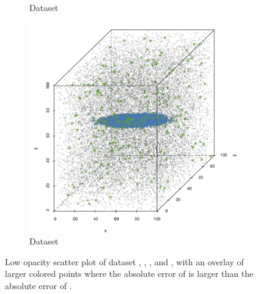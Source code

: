 \begin{figure}
\begin{subfigure}{0.23\textwidth}
			\caption{Dataset \baakmanFour}
			\label{fig:discussion:performance:mbeLowerError:baakman4}
		\end{subfigure}		
		\begin{subfigure}{0.23\textwidth}
			\centering
			\includegraphics[keepaspectratio=true, width=\textwidth, height=0.23\textheight]{discussion/img/baakman_5_abs_error_mbeSmallerThansambe}
			\caption{Dataset \baakmanFive}
			\label{fig:discussion:performance:mbeLowerError:baakman5}
		\end{subfigure}			
		\caption{Low opacity scatter plot of dataset %
			 \ferdosiOne, %
			 \baakmanOne, %
			 \baakmanFour, and%
			 \baakmanFive, %
			with an overlay of larger colored points where the absolute error of \sambe is larger than the absolute error of \mbe.}
		\label{fig:discussion:performance:singleSphere:mbeLowerError}
	\end{figure}
	
